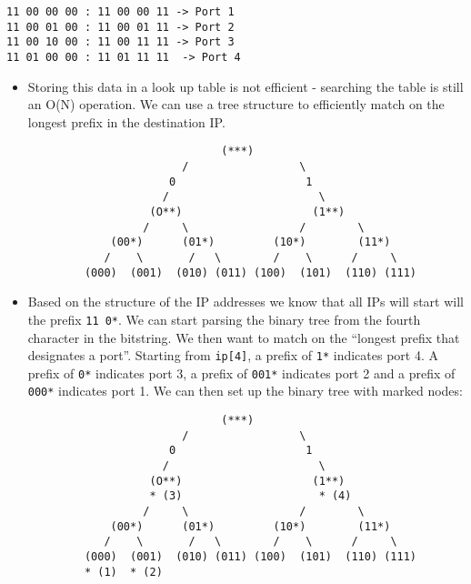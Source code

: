 \documentclass[]{article}
\providecommand{\tightlist}{%
  \setlength{\itemsep}{0pt}\setlength{\parskip}{0pt}}
\begin{document}
\begin{itemize}
\begin{verbatim}
11 00 00 00 : 11 00 00 11 -> Port 1
11 00 01 00 : 11 00 01 11 -> Port 2
11 00 10 00 : 11 00 11 11 -> Port 3
11 01 00 00 : 11 01 11 11  -> Port 4
\end{verbatim}

  \begin{itemize}
  \tightlist
  \item
    Storing this data in a look up table is not efficient - searching
    the table is still an O(N) operation. We can use a tree structure to
    efficiently match on the longest prefix in the destination IP.
  \end{itemize}

\begin{verbatim}
                                 (***)
                           /                 \
                         0                    1
                        /                       \
                      (O**)                    (1**)
                     /     \                 /        \
                (00*)      (01*)         (10*)        (11*)
               /    \       /   \        /    \      /     \
            (000)  (001)  (010) (011) (100)  (101)  (110) (111)
\end{verbatim}

  \begin{itemize}
  \tightlist
  \item
    Based on the structure of the IP addresses we know that all IPs will
    start will the prefix \texttt{11\ 0*}. We can start parsing the
    binary tree from the fourth character in the bitstring. We then want
    to match on the ``longest prefix that designates a port''. Starting
    from \texttt{ip{[}4{]}}, a prefix of \texttt{1*} indicates port 4. A
    prefix of \texttt{0*} indicates port 3, a prefix of \texttt{001*}
    indicates port 2 and a prefix of \texttt{000*} indicates port 1. We
    can then set up the binary tree with marked nodes:
  \end{itemize}

\begin{verbatim}
                                 (***)
                           /                 \
                         0                    1
                        /                       \
                      (O**)                    (1**)
                      * (3)                     * (4)
                     /     \                 /        \
                (00*)      (01*)         (10*)        (11*)
               /    \       /   \        /    \      /     \
            (000)  (001)  (010) (011) (100)  (101)  (110) (111)
            * (1)  * (2)
\end{verbatim}


\end{itemize}
\end{document}
